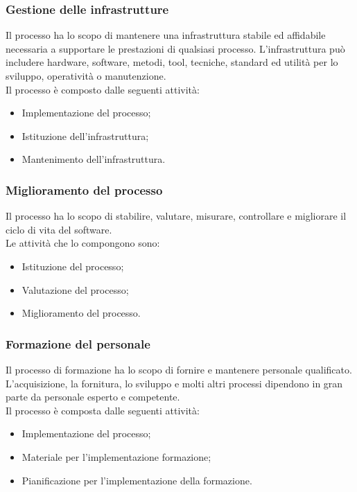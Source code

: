 \subsubsection{Gestione delle infrastrutture}
Il processo ha lo scopo di mantenere una infrastruttura stabile ed affidabile necessaria a supportare le prestazioni di qualsiasi processo. L'infrastruttura può includere hardware, software, metodi, tool, tecniche, standard ed utilità per lo sviluppo, operatività o manutenzione.\\
Il processo è composto dalle seguenti attività:
\begin{itemize}
	\item Implementazione del processo;
	
	\item Istituzione dell'infrastruttura;
	
	\item Mantenimento dell'infrastruttura.
\end{itemize}

\subsubsection{Miglioramento del processo}
Il processo ha lo scopo di stabilire, valutare, misurare, controllare e migliorare il ciclo di vita del software.\\
Le attività che lo compongono sono:
\begin{itemize}
	\item Istituzione del processo;
	
	\item Valutazione del processo;
	
	\item Miglioramento del processo.
\end{itemize}

\subsubsection{Formazione del personale}
Il processo di formazione ha lo scopo di fornire e mantenere personale qualificato. L'acquisizione, la fornitura, lo sviluppo e molti altri processi dipendono in gran parte da personale esperto e competente.\\
Il processo è composta dalle seguenti attività:
\begin{itemize}
	\item Implementazione del processo;
	
	\item Materiale per l'implementazione formazione;
	
	\item Pianificazione per l'implementazione della formazione.
\end{itemize}


